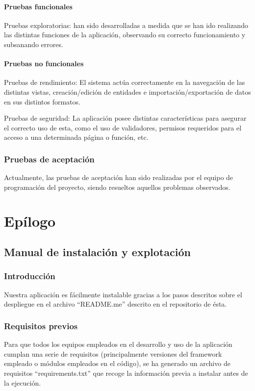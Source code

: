 \documentclass[12pt,letterpaper]{report}
\begin{document}
		\subsubsection{Pruebas funcionales}
Pruebas exploratorias: han sido desarrolladas a medida que se han ido realizando las distintas funciones de la aplicación, observando su correcto funcionamiento y subsanando errores.
		\subsubsection{Pruebas no funcionales}
		Pruebas de rendimiento: El sistema actúa correctamente en la navegación de las distintas vistas, creación/edición de entidades e importación/exportación de datos en sus distintos formatos.

Pruebas de seguridad: La aplicación posee distintas características para asegurar el correcto uso de esta, como el uso de validadores, permisos requeridos para el acceso a una determinada página o función, etc.
	\subsection{Pruebas de aceptación}
	Actualmente, las pruebas de aceptación han sido realizadas por el equipo de programación del proyecto, siendo resueltos aquellos problemas observados.
\chapter{Epílogo}

\section{Manual de instalación y explotación}
	\subsection{Introducción}
		Nuestra aplicación es fácilmente instalable gracias a los pasos descritos sobre el despliegue en el archivo “README.me” descrito en el repositorio de ésta.
	\subsection{Requisitos previos}
	Para que todos los equipos empleados en el desarrollo y uso de la aplicación cumplan una serie de requisitos (principalmente versiones del framework empleado o módulos empleados en el código), se ha generado un archivo de requisitos “requirements.txt” que recoge la información previa a instalar antes de la ejecución.
\end{document}
